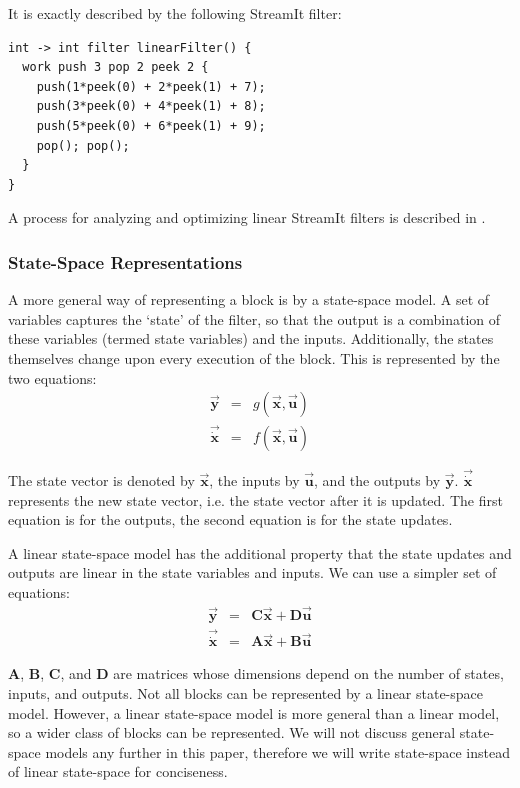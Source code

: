     It is exactly described by the following StreamIt filter:
\begin{scriptsize}
\begin{singlespace}
\begin{verbatim}
int -> int filter linearFilter() {
  work push 3 pop 2 peek 2 {
    push(1*peek(0) + 2*peek(1) + 7);
    push(3*peek(0) + 4*peek(1) + 8);
    push(5*peek(0) + 6*peek(1) + 9);
    pop(); pop();
  }
}
\end{verbatim}
\end{singlespace}
\end{scriptsize}

    A process for analyzing and optimizing linear StreamIt filters
is described in \cite{Lamb}.

\subsubsection{State-Space Representations}

    A more general way of representing a block is by a state-space model.
A set of variables captures the `state' of the filter, so that the
output is a combination of these variables (termed state
variables) and the inputs. Additionally, the states themselves
change upon every execution of the block. This is represented by
the two equations:
\begin{eqnarray*}
\vec{\mathbf{y}} & = & g(\vec{\mathbf{x}},\vec{\mathbf{u}}) \\
\vec{\dot{\mathbf{x}}} & = & f(\vec{\mathbf{x}},\vec{\mathbf{u}})
\end{eqnarray*}

    The state vector is denoted by $\vec{\mathbf{x}}$, the inputs by $\vec{\mathbf{u}}$,
and the outputs by $\vec{\mathbf{y}}$. $\vec{\dot{\mathbf{x}}}$
represents the new state vector, i.e. the state vector after it is
updated. The first equation is for the outputs, the second
equation is for the state updates.

    A linear state-space model has the additional property that
the state updates and outputs are linear in the state variables
and inputs. We can use a simpler set of equations:
\begin{eqnarray*}
\vec{\mathbf{y}} & = & \mathbf{C}\vec{\mathbf{x}}  +
\mathbf{D}\vec{\mathbf{u}} \\
\vec{\dot{\mathbf{x}}} & = & \mathbf{A}\vec{\mathbf{x}} +
\mathbf{B}\vec{\mathbf{u}}
\end{eqnarray*}

    $\mathbf{A}$, $\mathbf{B}$, $\mathbf{C}$, and $\mathbf{D}$ are
matrices whose dimensions depend on the number of states, inputs,
and outputs. Not all blocks can be represented by a linear
state-space model. However, a linear state-space model is more
general than a linear model, so a wider class of blocks can be
represented. We will not discuss general state-space models any
further in this paper, therefore we will write state-space instead
of linear state-space for conciseness.

